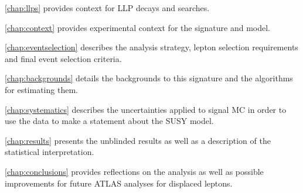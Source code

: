 \autoref{chap:llps} provides context for \ac{LLP} decays and searches.

\autoref{chap:context} provides experimental context for the signature and model.

\autoref{chap:eventselection} describes the analysis strategy, lepton selection requirements and final event selection criteria.

\autoref{chap:backgrounds} details the backgrounds to this signature and the algorithms for estimating them.

\autoref{chap:systematics} describes the uncertainties applied to signal \ac{MC} in order to use the data to make a statement about the \ac{SUSY} model.

\autoref{chap:results} presents the unblinded results as well as a description of the statistical interpretation. 

\autoref{chap:conclusions} provides reflections on the analysis as well as possible improvements for future \ac{ATLAS} analyses for displaced leptons.


